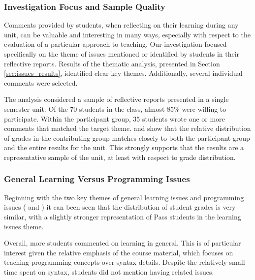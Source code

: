 \subsubsection{Investigation Focus and Sample Quality}
Comments provided by students, when reflecting on their learning during any unit, can be valuable and interesting in many ways, especially with respect to the evaluation of a particular approach to teaching. Our investigation focused specifically on the theme of issues mentioned or identified by students in their reflective reports. Results of the thematic analysis, presented in Section \ref{sec:issues_results}, identified clear key themes. Additionally, several individual comments were selected.

The analysis considered a sample of reflective reports presented in a single semester unit. Of the 70 students in the class, almost 85\% were willing to participate. Within the participant group, 35 students wrote one or more comments that matched the target theme.  and  show that the relative distribution of grades in the contributing group matches closely to both the participant group and the entire results for the unit. This strongly supports that the results are a representative sample of the unit, at least with respect to grade distribution. 


\subsubsection{General Learning Versus Programming Issues} %
\label{sub:balance_of_learning_versus_programming_issues}

Beginning with the two key themes of general learning issues and programming issues ( and ) it can been seen that the distribution of student grades is very similar, with a slightly stronger representation of Pass students in the learning issues theme.

Overall, more students commented on learning in general. This is of particular interest given the relative emphasis of the course material, which focuses on teaching programming concepts over syntax details. Despite the relatively small time spent on syntax, students did not mention having related issues.


